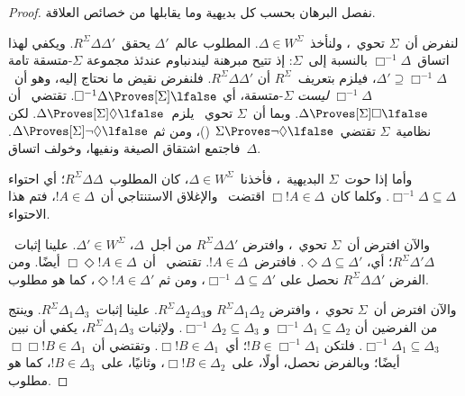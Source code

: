 \documentclass[../../../include/open-logic-section]{subfiles}
\begin{document}
\begin{proof}
  نفصل البرهان بحسب كل بديهية وما يقابلها من خصائص العلاقة.

  لنفرض أن~$\Sigma$ تحوي~، ولنأخذ~$\Delta \in W^\Sigma$.
  المطلوب عالم~$\Delta'$ يحقق~$R^\Sigma \Delta\Delta'$.
  ويكفي لهذا اتساق~$\Box^{-1}\Delta$ بالنسبة إلى~$\Sigma$:
  إذ تتيح مبرهنة ليندنباوم عندئذ مجموعة $\Sigma$-متسقة تامة
  $\Delta' \supseteq \Box^{-1}\Delta$، فيلزم بتعريف~$R^\Sigma$
  أن
  $R^\Sigma \Delta\Delta'$.
  فلنفرض نقيض ما نحتاج إليه، وهو أن~$\Box^{-1}\Delta$
  \emph{ليست} $\Sigma$-متسقة، أي $\Box^{-1}\Delta \Proves[\Sigma] \lfalse$.
  تقتضي~ أن
  $\Delta \Proves[\Sigma] \Box\lfalse$.
  وبما أن~$\Sigma$ تحوي~ يلزم~$\Delta \Proves[\Sigma] \Diamond\lfalse$.
  لكن نظامية~$\Sigma$ تقتضي~$\Sigma \Proves \lnot\Diamond \lfalse$
  ()، ومن ثم
  $\Delta \Proves[\Sigma] \lnot\Diamond \lfalse$.
  فاجتمع اشتقاق الصيغة ونفيها، وخولف اتساق~$\Delta$.

  وأما إذا حوت~$\Sigma$ البديهية~، فأخذنا~$\Delta \in W^\Sigma$،
  كان المطلوب~$R^\Sigma \Delta\Delta$؛ أي احتواء
  $\Box^{-1}\Delta \subseteq \Delta$.
  وكلما كان~$\Box!A \in \Delta$ اقتضت~ والإغلاق الاستنتاجي
  أن~$!A \in \Delta$، فتم هذا الاحتواء.

  والآن افترض أن~$\Sigma$ تحوي~، وافترض
  $R^\Sigma \Delta\Delta'$ من أجل~$\Delta$، $\Delta' \in W^\Sigma$.
  علينا إثبات~$R^\Sigma \Delta'\Delta$؛ أي،
  $\Diamond\Delta \subseteq \Delta'$. فافترض~$!A \in \Delta$.
  تقتضي~ أن~$\Box\Diamond!A \in \Delta$ أيضًا. ومن الفرض
  $R^\Sigma \Delta\Delta'$ نحصل على
  $\Box^{-1}\Delta \subseteq \Delta'$، ومن ثم
  $\Diamond!A \in \Delta'$، كما هو مطلوب.

  والآن افترض أن~$\Sigma$ تحوي~، وافترض
  $R^\Sigma \Delta_1\Delta_2$ و$R^\Sigma \Delta_2\Delta_3$.
  علينا إثبات~$R^\Sigma \Delta_1\Delta_3$. وينتج من الفرضين
   أن
  $\Box^{-1}\Delta_1 \subseteq \Delta_2$ و
  $\Box^{-1}\Delta_2 \subseteq \Delta_3$. ولإثبات
  $R^\Sigma \Delta_1\Delta_3$، يكفي أن نبين
  $\Box^{-1}\Delta_1 \subseteq \Delta_3$. فلتكن
  $!B \in \Box^{-1}\Delta_1$؛ أي~$\Box!B \in \Delta_1$. وتقتضي
   أن~$\Box\Box!B \in \Delta_1$ أيضًا؛ وبالفرض نحصل، أولًا،
  على~$\Box!B \in \Delta_2$، وثانيًا، على~$!B \in \Delta_3$، كما هو
  مطلوب.


\end{proof}
\end{document}
